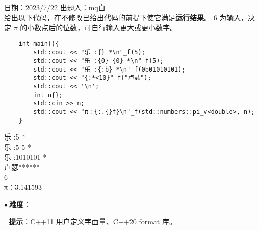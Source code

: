 日期：2023/7/22 出题人：mq白\\

给出以下代码，在不修改已给出代码的前提下使它满足\textbf{运行结果}。
6 为输入，决定 \textbf{$\pi$} 的小数点后的位数，可自行输入更大或更小数字。


\begin{verbatim}
    int main(){
        std::cout << "乐 :{} *\n"_f(5);
        std::cout << "乐 :{0} {0} *\n"_f(5);
        std::cout << "乐 :{:b} *\n"_f(0b01010101);
        std::cout << "{:*<10}"_f("卢瑟");
        std::cout << '\n';
        int n{};
        std::cin >> n;
        std::cout << "π：{:.{}f}\n"_f(std::numbers::pi_v<double>, n);
    }
\end{verbatim}

\begin{tcolorbox}[title = {要求运行结果},
        fonttitle = \bfseries, fontupper = \sffamily, fontlower = \itshape]
    乐 :5 *\\
    乐 :5 5 *\\
    乐 :1010101 *\\
    卢瑟******\\
    6\\
    π：3.141593
\end{tcolorbox}

$\bullet ~ $\textbf{难度}：    

$~~~$\textbf{提示}：C++11 用户定义字面量、C++20 format 库。